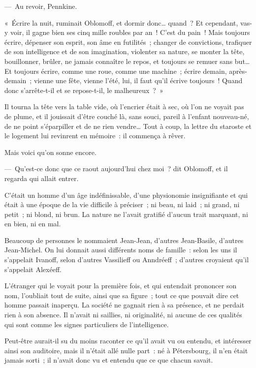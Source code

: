\documentclass[french,twoside]{book} %
\begin{document}
— Au revoir, Pennkine.\par
« Écrire la nuit, ruminait Oblomoff, et dormir donc… quand ? Et cependant, vas-y voir, il gagne bien ses cinq mille roubles par an ! C’est du pain ! Mais toujours écrire, dépenser son esprit, son âme en futilités ; changer de convictions, trafiquer de son intelligence et de son imagination, violenter sa nature, se monter la tête, bouillonner, brûler, ne jamais connaître le repos, et toujours se remuer sans but… Et toujours écrire, comme une roue, comme une machine ; écrire demain, après-demain ; vienne une fête, vienne l’été, lui, il faut qu’il écrive toujours ! Quand donc s’arrête-t-il et se repose-t-il, le malheureux ? »\par
Il tourna la tête vers la table vide, où l’encrier était à sec, où l’on ne voyait pas de plume, et il jouissait d’être couché là, sans souci, pareil à l’enfant nouveau-né, de ne point s’éparpiller et de ne rien vendre… Tout à coup, la lettre du staroste et le logement lui revinrent en mémoire : il commença à rêver.\par
Mais voici qu’on sonne encore.\par
— Qu’est-ce donc que ce raout aujourd’hui chez moi ? dit Oblomoff, et il regarda qui allait entrer.\par
C’était un homme d’un âge indéfinissable, d’une physionomie insignifiante et qui était à une époque de la vie difficile à préciser ; ni beau, ni laid ; ni grand, ni petit ; ni blond, ni brun. La nature ne l’avait gratifié d’aucun trait marquant, ni en bien, ni en mal.\par
Beaucoup de personnes le nommaient Jean-Jean, d’autres Jean-Basile, d’autres Jean-Michel. On lui donnait aussi différents noms de famille : selon les uns il s’appelait Ivanoff, selon d’autres Vassilieff ou Anndréeff ; d’autres croyaient qu’il s’appelait Alexéeff.\par
L’étranger qui le voyait pour la première fois, et qui entendait prononcer son nom, l’oubliait tout de suite, ainsi que sa figure ; tout ce que pouvait dire cet homme passait inaperçu. La société ne gagnait rien à sa présence, et ne perdait rien à son absence. Il n’avait ni saillies, ni originalité, ni aucune de ces qualités qui sont comme les signes particuliers de l’intelligence.\par
Peut-être aurait-il su du moins raconter ce qu’il avait vu ou entendu, et intéresser ainsi son auditoire, mais il n’était allé nulle part : né à Pétersbourg, il n’en était jamais sorti ; il n’avait donc vu et entendu que ce que chacun savait.\par
\end{document}
